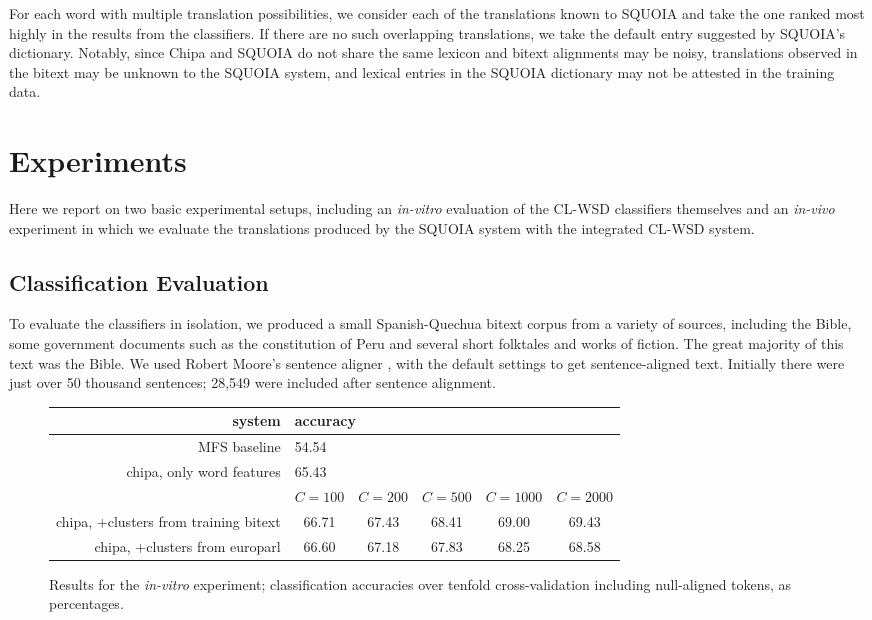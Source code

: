 For each word with multiple translation possibilities, we consider each of the
translations known to SQUOIA and take the one ranked most highly in the
results from the classifiers. If there are no such overlapping translations, we
take the default entry suggested by SQUOIA's dictionary.
Notably, since Chipa and SQUOIA do not share the same lexicon and bitext alignments
may be noisy, translations
observed in the bitext may be unknown to the SQUOIA system, and lexical entries in the
SQUOIA dictionary may not be attested in the training data.







\section{Experiments}
Here we report on two basic experimental setups, including an \emph{in-vitro}
evaluation of the CL-WSD classifiers themselves and an \emph{in-vivo}
experiment in which we evaluate the translations produced by the SQUOIA system
with the integrated CL-WSD system.

\subsection{Classification Evaluation}
To evaluate the classifiers in isolation, we produced a small Spanish-Quechua
bitext corpus from a variety of sources, including the Bible, some government
documents such as the constitution of Peru and several short folktales and
works of fiction. The great majority of this text was the Bible.
We used Robert Moore's sentence aligner \cite{DBLP:conf/amta/Moore02}, with the
default settings to get sentence-aligned text.
Initially there were just over 50 thousand sentences; 28,549 were included
after sentence alignment.

\begin{figure*}[t!]
  \begin{center}
  \begin{tabular}{|r|c|c|c|c|c|}
    \hline
    system                    & \multicolumn{5}{|l|}{accuracy} \\
    \hline
    MFS baseline              &  \multicolumn{5}{|l|}{54.54} \\
    chipa, only word features &  \multicolumn{5}{|l|}{65.43} \\
    \hline
           & $C=100$ & $C=200$ & $C=500$ & $C=1000$ & $C=2000$ \\
    \hline
    chipa, +clusters from training bitext &
    66.71 & 67.43 & 68.41 & 69.00 & 69.43 \\
    chipa, +clusters from europarl        &
    66.60 & 67.18 & 67.83 & 68.25 & 68.58 \\
    \hline
  \end{tabular}
  \end{center}
\caption{Results for the \emph{in-vitro} experiment; classification accuracies
over tenfold cross-validation including null-aligned tokens, as percentages. }
\label{fig:integrationresults1}
\end{figure*}

